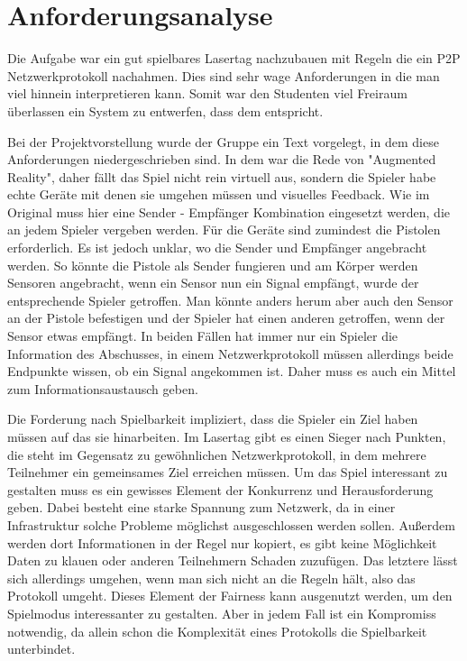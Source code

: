 \section{Anforderungsanalyse}

Die Aufgabe war ein gut spielbares Lasertag nachzubauen mit Regeln die ein
P2P Netzwerkprotokoll nachahmen. Dies sind sehr wage Anforderungen in die man
viel hinnein interpretieren kann. Somit war den Studenten viel Freiraum
überlassen ein System zu entwerfen, dass dem entspricht.

Bei der Projektvorstellung wurde der Gruppe ein Text vorgelegt, in dem diese
Anforderungen niedergeschrieben sind. In dem war die Rede von 
"Augmented Reality", daher fällt das Spiel nicht rein virtuell aus, sondern
die Spieler habe echte Geräte mit denen sie umgehen müssen und visuelles
Feedback. Wie im Original muss hier eine Sender - Empfänger Kombination
eingesetzt werden, die an jedem Spieler vergeben werden. Für die Geräte sind
zumindest die Pistolen erforderlich. Es ist jedoch unklar, wo die Sender und
Empfänger angebracht werden. So könnte die Pistole als Sender fungieren und
am Körper werden Sensoren angebracht, wenn ein Sensor nun ein Signal empfängt,
wurde der entsprechende Spieler getroffen. Man könnte anders herum aber auch
den Sensor an der Pistole befestigen und der Spieler hat einen anderen
getroffen, wenn der Sensor etwas empfängt. In beiden Fällen hat immer nur ein
Spieler die Information des Abschusses, in einem Netzwerkprotokoll müssen
allerdings beide Endpunkte wissen, ob ein Signal angekommen ist. Daher muss
es auch ein Mittel zum Informationsaustausch geben.

Die Forderung nach Spielbarkeit impliziert, dass die Spieler ein Ziel haben
müssen auf das sie hinarbeiten. Im Lasertag gibt es einen Sieger nach Punkten,
die steht im Gegensatz zu gewöhnlichen Netzwerkprotokoll, in dem mehrere
Teilnehmer ein gemeinsames Ziel erreichen müssen. Um das Spiel interessant zu
gestalten muss es ein gewisses Element der Konkurrenz und Herausforderung geben.
Dabei besteht eine starke Spannung zum Netzwerk, da in einer Infrastruktur
solche Probleme möglichst ausgeschlossen werden sollen. Außerdem werden dort
Informationen in der Regel nur kopiert, es gibt keine Möglichkeit Daten zu
klauen oder anderen Teilnehmern Schaden zuzufügen. Das letztere lässt sich
allerdings umgehen, wenn man sich nicht an die Regeln hält, also das Protokoll
umgeht. Dieses Element der Fairness kann ausgenutzt werden, um den Spielmodus
interessanter zu gestalten. Aber in jedem Fall ist ein Kompromiss notwendig,
da allein schon die Komplexität eines Protokolls die Spielbarkeit unterbindet.

